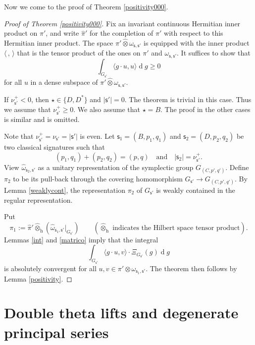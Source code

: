 \documentclass[11pt,a4paper]{amsart}
\def\abs#1{\left|{#1}\right|}
\newcommand{\od}{\operatorname{d}}
\newcommand{\la}{\langle}
\newcommand{\ra}{\rangle}
\numberwithin{equation}{section}
\theoremstyle{remark}
\begin{document}
Now we come to the proof of Theorem \ref{positivity000}.

\begin{proof}[Proof of Theorem \ref{positivity000}]
Fix an invariant continuous Hermitian inner product on $\pi'$, and  write $\hat \pi'$ for the completion of $\pi'$ with respect to this Hermitian inner product.
The space $\pi' \widehat \otimes \omega_{\mathsf s, \mathsf s'}$ is equipped with the  inner product $\la\,,\,\ra$  that is the tensor product of the ones on $\pi'$ and $\omega_{\mathsf s, \mathsf s'} $. It suffices to show that
\[
  \int_{G_{\mathsf s'}}\la g \cdot u,u\ra\od\! g\geq 0
\]
for all $u$ in a dense subspace of $\pi' \widehat \otimes \omega_{\mathsf s, \mathsf s'}$.

If $\nu^+_{\mathsf s'}<0$, then $\star\in \{D, D^*\}$ and $\abs{\mathsf s'}=0$. The theorem is trivial in this case.  Thus we assume that $\nu^+_{\mathsf s'}\geq 0$.
We also assume that $\star=B$. The proof in the other cases is similar and is omitted.

Note that $\nu^+_{\mathsf s'}=\nu_{\mathsf s'}=\abs{\mathsf s'}$ is even.
 Let $\mathsf s_1=(B, p_1, q_1)$ and  $\mathsf s_2=(D, p_2, q_2)$ be two classical signatures such that
\[
  (p_1, q_1)+(p_2, q_2)=(p,q)\quad \textrm{and}\quad \abs{\mathsf s_2}=\nu^+_{\mathsf s'}.
\]
View $\hat \omega_{\mathsf s_2, \mathsf s'}$ as a unitary representation of the symplectic group $G_{(C, p',q')}$.
Define $\pi_2$ to be its  pull-back through the covering homomorphism $G_{\mathsf s'}\rightarrow G_{(C, p',q')}$. By Lemma \ref{weaklycont}, the representation $\pi_2$ of $G_{\mathsf s'}$ is weakly contained in the regular representation.

Put
\[
  \pi_1:=\hat \pi'\widehat \otimes_{\mathrm h} (\hat \omega_{\mathsf s_1, \mathsf s'}|_{G_{\mathsf s'}})\qquad (\textrm{$\widehat \otimes_{\mathrm h}$ indicates the Hilbert space tensor product}).
\]
 Lemmas  \ref{int} and \ref{matrico} imply that the integral
\[
 \int_{G_{\mathsf s'}} \la g\cdot u,v\ra \cdot \Xi_{G_{\mathsf s'}}(g)\od\!g
\]
is absolutely convergent for all $u,v\in \pi' \otimes \omega_{\mathsf s_1, \mathsf s'}$. The theorem then follows by Lemma \ref{positivity}.
\end{proof}



\section{Double theta lifts and degenerate principal series}\label{sec:dtheta}
\end{document}
